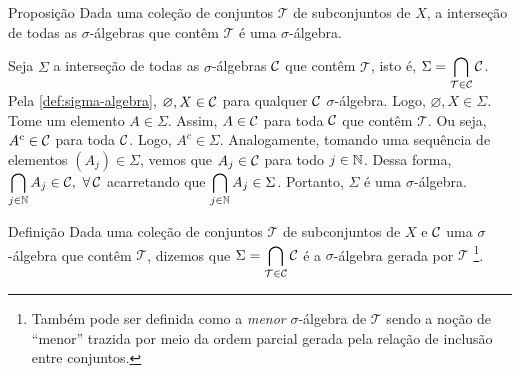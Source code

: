\begin{env}{Proposição}
	\label{prop: provar que a menor sigma algebra e algebra}
	Dada uma coleção de conjuntos $\mathcal{T}$ de subconjuntos de $X$, a interseção de todas as $\sigma$-álgebras que contêm $\mathcal{T}$ é uma $\sigma$-álgebra.
\end{env}
\begin{prova}
	Seja $\Sigma$ a interseção de todas as $\sigma$-álgebras $\operatorname{\mathcal{C}}$ que contêm $\mathcal{T}$, isto é, 
	$\Sigma = \displaystyle \bigcap_{\mathcal{T} \in \operatorname{\mathcal{C}} } \operatorname{\mathcal{C}}$.
	Pela \ref{def:sigma-algebra}, $\varnothing, X \in \operatorname{\mathcal{C}}$ para qualquer $\operatorname{\mathcal{C}}$ $\sigma$-álgebra.
	Logo, $\varnothing, X \in \Sigma$.
	Tome um elemento $A \in \Sigma$.
	Assim, $A \in \operatorname{\mathcal{C}}$ para toda $\operatorname{\mathcal{C}}$ que contêm $\mathcal{T}$.
	Ou seja, $A^c \in \operatorname{\mathcal{C}}$ para toda \sigal $\operatorname{\mathcal{C}}$. 
	Logo, $A^c \in \Sigma$.
	Analogamente, tomando uma sequência de elementos $(A_j) \in \Sigma$, vemos que $A_j \in \operatorname{\mathcal{C}}$ para todo $j \in \operatorname{\mathbb{N}}$. 
	Dessa forma, $\displaystyle \bigcap_{j \in \N} A_j \in \cc,\ \forall \cc$ acarretando que $\displaystyle \bigcap_{j \in \operatorname{\mathbb{N}}} A_j \in \Sigma$.
	Portanto, $\Sigma$ é uma $\sigma$-álgebra.
\end{prova}

\begin{env}{Definição}
	\label{deff: sigma algebra gerada}
	Dada uma coleção de conjuntos $\mathcal{T}$ de subconjuntos de $X$ e $\operatorname{\mathcal{C}}$ uma $\sigma$-álgebra que contêm $\mathcal{T}$, dizemos que
	$
	\Sigma = \displaystyle \bigcap_{\mathcal{T} \in \operatorname{\mathcal{C}} } \operatorname{\mathcal{C}}
	$
	é a $\sigma$-álgebra gerada por $\mathcal{T}$
	\footnote{Também pode ser definida como a \textit{menor} $\sigma$-álgebra de $\mathcal{T}$ sendo a noção de \enquote{menor} trazida por meio da ordem parcial gerada pela relação de inclusão entre conjuntos.}.
\end{env}

